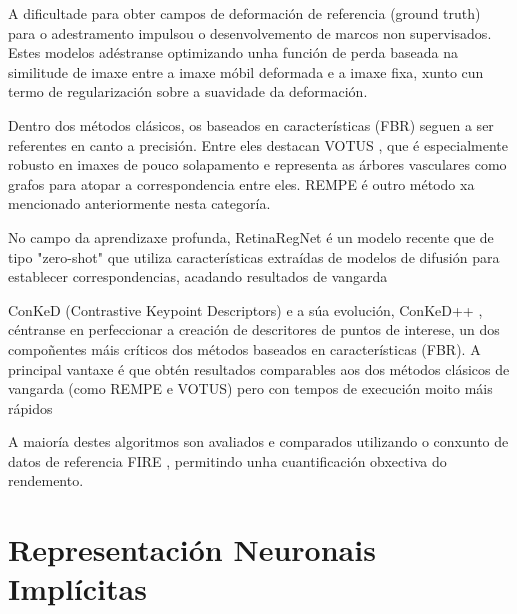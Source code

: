 A dificultade para obter campos de deformación de referencia (ground truth) para o adestramento impulsou o desenvolvemento de marcos non supervisados. Estes modelos adéstranse optimizando unha función de perda baseada na similitude de imaxe entre a imaxe móbil deformada e a imaxe fixa, xunto cun termo de regularización sobre a suavidade da deformación. 


Dentro dos métodos clásicos, os baseados en características (FBR) seguen a ser referentes en canto a precisión. Entre eles destacan VOTUS \cite{Votus}, que é especialmente robusto en imaxes de pouco solapamento e representa as árbores vasculares como grafos para atopar a correspondencia entre eles. REMPE \cite{rempe} é outro método xa mencionado anteriormente nesta categoría.

No campo da aprendizaxe profunda, RetinaRegNet \cite{sivaraman2024retinaregnetzeroshotapproachretinal} é un modelo recente que de tipo "zero-shot" que utiliza características extraídas de modelos de difusión para establecer correspondencias, acadando resultados de vangarda

ConKeD (Contrastive Keypoint Descriptors) e a súa evolución, ConKeD++ , céntranse en perfeccionar a creación de descritores de puntos de interese, un dos compoñentes máis críticos dos métodos baseados en características (FBR).
A principal vantaxe é que obtén resultados comparables aos dos métodos clásicos de vangarda (como REMPE e VOTUS) pero con tempos de execución moito máis rápidos

A maioría destes algoritmos son avaliados e comparados utilizando o conxunto de datos de referencia FIRE \cite{FIRE}, permitindo unha cuantificación obxectiva do rendemento.

\section{Representación Neuronais Implícitas}
\label{sec:Representación Neuronais Implícitas} 


